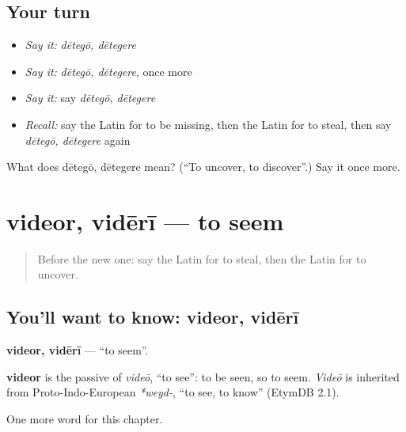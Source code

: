 \subsection*{Your turn}
\begin{itemize}
\raggedright
  \item \emph{Say it:} \emph{dētegō, dētegere}
  \item \emph{Say it:} \emph{dētegō, dētegere}, once more
  \item \emph{Say it:} say \emph{dētegō, dētegere}
  \item \emph{Recall:} say the Latin for to be missing, then the Latin for to steal, then say \emph{dētegō, dētegere} again
\end{itemize}

\begin{tcolorbox}[breakable,colback=teal!4,colframe=teal!35!black,title={Before you move on}]
What does dētegō, dētegere mean? (\textquotedblleft{}To uncover, to discover\textquotedblright{}.) Say it once more.
\end{tcolorbox}
\section[videor, vidērī]{videor, vidērī — to seem}

\label{lesson:LA-C232-videor}



\begin{quote}
Before the new one: say the Latin for to steal, then the Latin for to uncover.
\end{quote}

\subsection*{You'll want to know: videor, vidērī}
\textbf{videor, vidērī} — \textquotedblleft{}to seem\textquotedblright{}.

\begin{cousinweb}
\textbf{videor} is the passive of \emph{videō}, \textquotedblleft{}to see\textquotedblright{}: to be seen, so to seem. \emph{Videō} is inherited from Proto-Indo-European \emph{*weyd-}, \textquotedblleft{}to see, to know\textquotedblright{} (EtymDB 2.1).
\end{cousinweb}

\begin{grammarlens}[title={What you've built}]
One more word for this chapter.
\end{grammarlens}

